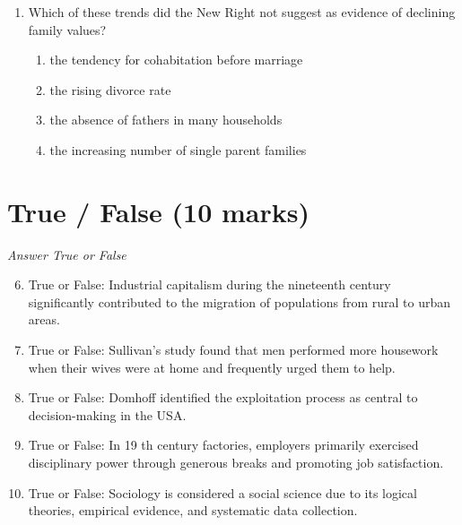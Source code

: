 \documentclass[12pt]{article}
\begin{document}
\begin{enumerate}[label=\arabic*.]
\begin{enumerate}[label=(\alph*)]
    \item formed an inferior 'race' with low levels of intelligence
    \item lived morally unsound lives of crime and squalor
    \item were too reliant upon welfare benefits
    \item all of the above
\end{enumerate}
\item Which of these trends did the New Right not suggest as evidence of declining family values?
\begin{enumerate}[label=(\alph*)]
    \item the tendency for cohabitation before marriage
    \item the rising divorce rate
    \item the absence of fathers in many households
    \item the increasing number of single parent families
\end{enumerate}
\end{enumerate}

\section*{True / False (10 marks)}
\textit{Answer True or False}
\begin{enumerate}[label=\arabic*.]
\setcounter{enumi}{5}
\item True or False: Industrial capitalism during the nineteenth century significantly contributed to the migration of populations from rural to urban areas.
\item True or False: Sullivan's study found that men performed more housework when their wives were at home and frequently urged them to help.
\item True or False: Domhoff identified the exploitation process as central to decision-making in the USA.
\item True or False: In 19 th century factories, employers primarily exercised disciplinary power through generous breaks and promoting job satisfaction.
\item True or False: Sociology is considered a social science due to its logical theories, empirical evidence, and systematic data collection.
\end{enumerate}
\end{document}
